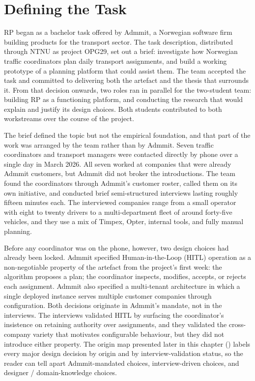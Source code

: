 \section{Defining the Task}
\label{sec:defining-task}

RP began as a bachelor task offered by Admmit, a Norwegian software firm building products for the transport sector. The task description, distributed through NTNU as project OPG29, set out a brief: investigate how Norwegian traffic coordinators plan daily transport assignments, and build a working prototype of a planning platform that could assist them. The team accepted the task and committed to delivering both the artefact and the thesis that surrounds it. From that decision onwards, two roles ran in parallel for the two-student team: building RP as a functioning platform, and conducting the research that would explain and justify its design choices. Both students contributed to both workstreams over the course of the project.

The brief defined the topic but not the empirical foundation, and that part of the work was arranged by the team rather than by Admmit. Seven traffic coordinators and transport managers were contacted directly by phone over a single day in March 2026. All seven worked at companies that were already Admmit customers, but Admmit did not broker the introductions. The team found the coordinators through Admmit's customer roster, called them on its own initiative, and conducted brief semi-structured interviews lasting roughly fifteen minutes each. The interviewed companies range from a small operator with eight to twenty drivers to a multi-department fleet of around forty-five vehicles, and they use a mix of Timpex, Opter, internal tools, and fully manual planning.

Before any coordinator was on the phone, however, two design choices had already been locked. Admmit specified Human-in-the-Loop (HITL) operation as a non-negotiable property of the artefact from the project's first week: the algorithm proposes a plan; the coordinator inspects, modifies, accepts, or rejects each assignment. Admmit also specified a multi-tenant architecture in which a single deployed instance serves multiple customer companies through configuration. Both decisions originate in Admmit's mandate, not in the interviews. The interviews validated HITL by surfacing the coordinator's insistence on retaining authority over assignments, and they validated the cross-company variety that motivates configurable behaviour, but they did not introduce either property. The origin map presented later in this chapter () labels every major design decision by origin and by interview-validation status, so the reader can tell apart Admmit-mandated choices, interview-driven choices, and designer / domain-knowledge choices.

